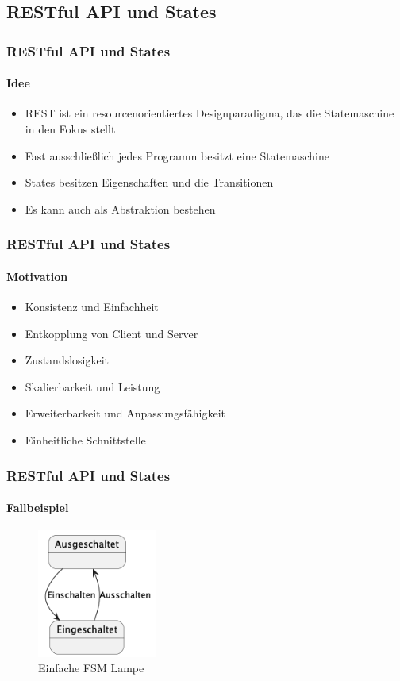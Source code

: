 \subsection{RESTful API und States}
\begin{frame}
  \frametitle{RESTful API und States}
  \framesubtitle{Idee}
  \begin{itemize}
    \item REST ist ein resourcenorientiertes Designparadigma, das die Statemaschine in den Fokus stellt
    \item Fast ausschließlich jedes Programm besitzt eine Statemaschine
    \item States besitzen Eigenschaften und die Transitionen
    \item Es kann auch als Abstraktion bestehen
  \end{itemize}
\end{frame}

\begin{frame}
  \frametitle{RESTful API und States}
  \framesubtitle{Motivation}
  \begin{itemize}
    \item Konsistenz und Einfachheit
    \item Entkopplung von Client und Server
    \item Zustandslosigkeit
    \item Skalierbarkeit und Leistung
    \item Erweiterbarkeit und Anpassungsfähigkeit
    \item Einheitliche Schnittstelle
  \end{itemize}
\end{frame}

\begin{frame}[fragile]
  \frametitle{RESTful API und States}
  \framesubtitle{Fallbeispiel}

  \begin{figure}[!ht]
    \centering
    \includegraphics[width=0.35\textwidth]{fig/uml/lampe.png}
    \caption{Einfache FSM Lampe}
    \label{fig:lampe}
  \end{figure}
\end{frame}

